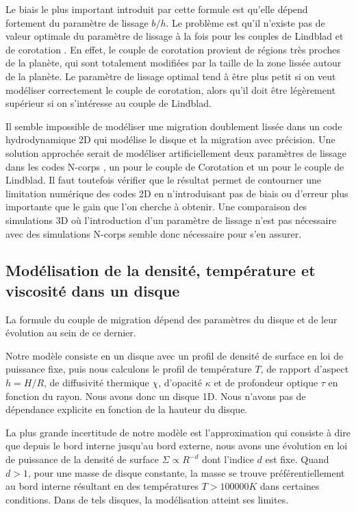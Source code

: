 Le biais le plus important introduit par cette formule est qu'elle dépend fortement du paramètre de lissage $b/h$. Le problème
est qu'il n'existe pas de valeur optimale du paramètre de lissage à la fois pour les couples de Lindblad et de corotation
\citep{masset2002coorbital}. En effet, le couple de corotation provient de régions très proches de la planète, qui sont
totalement modifiées par la taille de la zone lissée autour de la planète. Le paramètre de lissage optimal tend à être plus
petit si on veut modéliser correctement le couple de corotation, alors qu'il doit être légèrement supérieur si on s'intéresse au
couple de Lindblad. 

Il semble impossible de modéliser une migration doublement lissée dans un code hydrodynamique 2D qui modélise le disque et la migration avec précision. Une solution approchée serait de modéliser artificiellement deux paramètres de lissage dans les codes N-corps , un pour le couple de Corotation et un pour le couple de Lindblad. Il faut toutefois vérifier que le résultat permet de contourner une limitation numérique des codes 2D en n'introduisant pas de biais ou d'erreur plus importante que le gain que l'on cherche à obtenir. Une comparaison des simulations 3D où l'introduction d'un paramètre de lissage n'est pas nécessaire avec des simulations N-corps semble donc nécessaire pour s'en assurer. 

\subsection{Modélisation de la densité, température et viscosité dans un disque}
La formule du couple de migration dépend des paramètres du disque et de leur évolution au sein de ce dernier. 

Notre modèle consiste en un disque avec un profil de densité de surface en loi de puissance fixe, puis nous calculons le profil de température $T$, de rapport d'aspect $h=H/R$, de diffusivité thermique $\chi$, d'opacité $\kappa$ et de profondeur optique $\tau$ en fonction du rayon. Nous avons donc un disque 1D. Nous n'avons pas de dépendance explicite en fonction de la hauteur du disque. 

La plus grande incertitude de notre modèle est l'approximation qui consiste à dire que depuis le bord interne jusqu'au bord externe, nous avons une évolution en loi de puissance de la densité de surface $\Sigma\propto R^{-d}$ dont l'indice $d$ est fixe. Quand $d>1$, pour une masse de disque constante, la masse se trouve préférentiellement au bord interne résultant en des températures $T>100 000\unit{K}$ dans certaines conditions. Dans de tels disques, la modélisation atteint ses limites.

